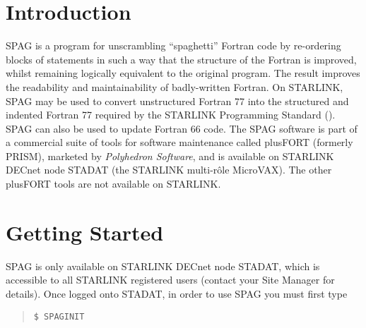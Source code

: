 \stardocabstract
 \newpage
 \begin{latexonly}
   \setlength{\parskip}{0mm}
   \latexonlytoc
   \setlength{\parskip}{\medskipamount}
   \markright{\stardocname}
 \end{latexonly}
\newpage
\renewcommand{\thepage}{\arabic{page}}
\setcounter{page}{1}

\section {Introduction}

SPAG is a program for unscrambling ``spaghetti'' Fortran code by
re-ordering blocks of statements in such a way that the structure of the
Fortran is improved, whilst remaining logically equivalent to the original
program. 
The result improves the readability and maintainability of badly-written
Fortran.
On STARLINK, SPAG may be used to convert unstructured Fortran
77 into the structured and indented Fortran 77 required by the
STARLINK Programming Standard
(). 
SPAG can also be used to update Fortran 66 code.
The SPAG software is part of a commercial suite of tools for software
maintenance called plusFORT (formerly PRISM), marketed by {\it Polyhedron
Software}, and is available on STARLINK DECnet node STADAT (the STARLINK
multi-r\^{o}le MicroVAX).
The other plusFORT tools are not available on STARLINK.


\section{Getting Started}

SPAG is only available on STARLINK DECnet node STADAT, which is accessible
to all STARLINK registered users (contact your Site Manager for details). 
Once logged onto STADAT, in order to use SPAG you must first type

\begin {quote}
\begin{verbatim}
$ SPAGINIT
\end{verbatim}
\end {quote}

